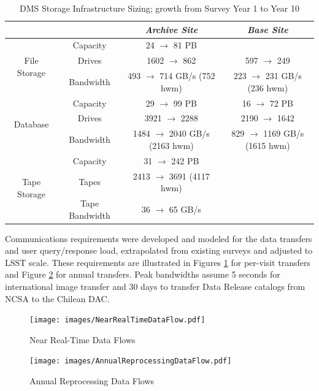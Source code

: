 \centering
\begin{longtable}{|c|c|c|c|}
\caption{DMS Storage Infrastructure Sizing; growth from Survey Year 1 to Year 10 \label{table:storage-sizing}}\\
\hline
	& & \textit{Archive Site} & \textit{Base Site} \\ \hline
\multirow{3}{*}{File Storage} & Capacity & 24 $\rightarrow$ 81 PB & \\ \cline{2-4}
  & Drives & 1602 $\rightarrow$ 862 & 597 $\rightarrow$ 249 \\ \cline{2-4}
  & Bandwidth & 493 $\rightarrow$ 714 GB/s (752 hwm) & 223 $\rightarrow$ 231 GB/s (236 hwm) \\ \hline
\multirow{3}{*}{Database} & Capacity & 29 $\rightarrow$ 99 PB & 16 $\rightarrow$ 72 PB \\ \cline{2-4}
  & Drives & 3921 $\rightarrow$ 2288 & 2190 $\rightarrow$ 1642 \\ \cline{2-4}
  & Bandwidth & 1484 $\rightarrow$ 2040 GB/s (2163 hwm) & 829 $\rightarrow$ 1169 GB/s (1615 hwm) \\ \hline
\multirow{3}{*}{Tape Storage} & Capacity & 31 $\rightarrow$ 242 PB & \\ \cline{2-4}
  & Tapes & 2413 $\rightarrow$ 3691 (4117 hwm) & \\ \cline{2-4}
  & Tape Bandwidth & 36 $\rightarrow$ 65 GB/s & \\ \hline
\end{longtable}


Communications requirements were developed and modeled for the data transfers
and user query/response load, extrapolated from existing surveys and adjusted
to LSST scale.  These requirements are illustrated in Figures \ref{fig:near-real-time-flows} for per-visit transfers and Figure \ref{fig:annual-reprocessing-flows} for annual transfers.  Peak bandwidths assume 5 seconds for international
image transfer and 30 days to transfer Data Release catalogs from NCSA to the
Chilean DAC.

\begin{figure}
\centering
\texttt{[image: images/NearRealTimeDataFlow.pdf]}
\caption{Near Real-Time Data Flows}
\label{fig:near-real-time-flows}
\end{figure}

\begin{figure}
\centering
\texttt{[image: images/AnnualReprocessingDataFlow.pdf]}
\caption{Annual Reprocessing Data Flows}
\label{fig:annual-reprocessing-flows}
\end{figure}

